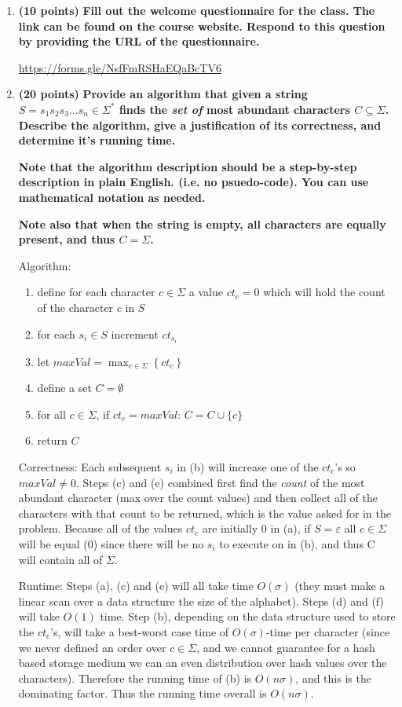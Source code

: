 \documentclass[11pt, oneside]{article}   	%
\begin{document}
\begin{enumerate}
\item \textbf{(10 points)} 
\textbf{Fill out the welcome questionnaire for the class. 
The link can be found on the course website. 
Respond to this question by providing the URL of the questionnaire.}

\url{https://forms.gle/NsfFmRSHaEQaBcTV6}


\item \textbf{(20 points)} 
\textbf{Provide an algorithm that given a string $S=s_1s_2s_3...s_n \in \Sigma^*$ finds the \emph{set of} most abundant characters $C\subseteq\Sigma$. 
Describe the algorithm, give a justification of its correctness, and determine it's running time.}

\textbf{Note that the algorithm description should be a step-by-step description in plain English. (i.e. no psuedo-code). 
You can use mathematical notation as needed.  }

\textbf{Note also that when the string is empty, all characters are equally present, and thus $C = \Sigma$. }

Algorithm: 
\begin{enumerate}
\item define for each character $c\in\Sigma$ a value $ct_c = 0$ which will hold the count of the character $c$ in $S$
\item for each $s_i \in S$ increment $ct_{s_i}$
\item let $maxVal = \max_{c\in\Sigma}\left\{ct_c\right\}$
\item define a set $C = \emptyset$
\item for all $c \in \Sigma$, if $ct_c = maxVal$: $C = C \cup \{c\}$
\item return $C$
\end{enumerate}

Correctness:
Each subsequent $s_i$ in (b) will increase one of the $ct_c$'s so $maxVal \ne 0$. 
Steps (c) and (e) combined first find the \emph{count} of the most abundant character (max over the count values) and then collect all of the characters with that count to be returned, 
which is the value asked for in the problem. 
Because all of the values $ct_c$ are initially $0$ in (a), if $S=\varepsilon$ all $c\in\Sigma$ will be equal (0) since there will be no $s_i$ to execute on in (b), and thus C will contain all of $\Sigma$. 

Runtime: 
Steps (a), (c) and (e) will all take time $O(\sigma)$ (they must make a linear scan over a data structure the size of the alphabet). 
Steps (d) and (f) will take $O(1)$ time. 
Step (b), depending on the data structure used to store the $ct_c$'s, will take a best-worst case time of $O(\sigma)$-time per character 
(since we never defined an order over $c\in\Sigma$, and we cannot guarantee for a hash based storage medium we can an even distribution over hash values over the characters).
Therefore the running time of (b) is $O(n\sigma)$, and this is the dominating factor.
Thus the running time overall is $O(n\sigma)$.

\end{enumerate}
\end{document}

